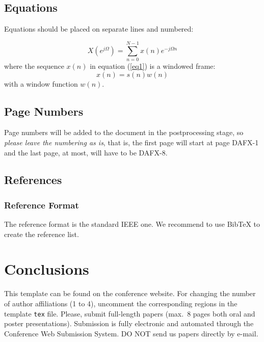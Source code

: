 \documentclass[twoside,a4paper]{article}
\begin{document}
\subsection{Equations}
Equations should be placed on separate lines and numbered:

\begin{equation}
	X(e^{j\Omega})=\sum_{n=0}^{N-1}x(n)e^{-j\Omega n}
	\label{eq1}
	\end{equation}
	where the sequence $x(n)$ in equation (\ref{eq1}) is a windowed frame:
	\begin{equation}
	x(n)=s(n) w(n)
	\label{eq2}
\end{equation}
%
with a window function $w(n)$.


\subsection{Page Numbers}
Page numbers will be added to the document in the postprocessing stage, so {\em please leave the numbering as is},
that is, the first page will start at page DAFX-1 and the last page, at most, will have to be DAFX-8.


\subsection{References}


\subsubsection{Reference Format}
The reference format is the standard IEEE one. We recommend to use BibTeX to create the reference list.


\section{Conclusions}
This template can be found on the conference website.
For changing the number of author affiliations (1 to 4), uncomment the corresponding regions in the template \texttt{tex} file.
Please, submit full-length papers (max.~8 pages both oral and poster presentations).
Submission is fully electronic and automated through the Conference Web Submission System.
DO NOT send us papers directly by e-mail.
\end{document}
